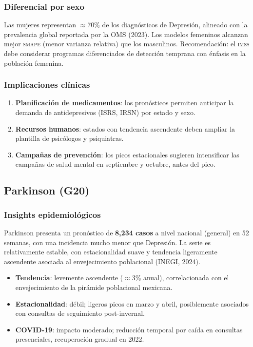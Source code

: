 \documentclass[12pt, letterpaper]{article}
\newcommand{\smape}{\textnormal{\textsc{smape}}}
\newcommand{\imss}{\textnormal{\textsc{imss}}}
\begin{document}
\subsubsection{Diferencial por sexo}

Las mujeres representan $\approx$70\% de los diagnósticos de Depresión, alineado con la prevalencia global reportada por la OMS (2023). Los modelos femeninos alcanzan mejor \smape{} (menor varianza relativa) que los masculinos. Recomendación: el {\imss} debe considerar programas diferenciados de detección temprana con énfasis en la población femenina.

\subsubsection{Implicaciones clínicas}

\begin{enumerate}[noitemsep]
    \item \textbf{Planificación de medicamentos}: los pronósticos permiten anticipar la demanda de antidepresivos (ISRS, IRSN) por estado y sexo.
    \item \textbf{Recursos humanos}: estados con tendencia ascendente deben ampliar la plantilla de psicólogos y psiquiatras.
    \item \textbf{Campañas de prevención}: los picos estacionales sugieren intensificar las campañas de salud mental en septiembre y octubre, antes del pico.
\end{enumerate}

\subsection{Parkinson (G20)}\label{subsec:parkinson}

\subsubsection{Insights epidemiológicos}

Parkinson presenta un pronóstico de \textbf{8,234 casos} a nivel nacional (general) en 52 semanas, con una incidencia mucho menor que Depresión. La serie es relativamente estable, con estacionalidad suave y tendencia ligeramente ascendente asociada al envejecimiento poblacional (INEGI, 2024).

\begin{itemize}[noitemsep]
    \item \textbf{Tendencia}: levemente ascendente ($\approx$3\% anual), correlacionada con el envejecimiento de la pirámide poblacional mexicana.
    \item \textbf{Estacionalidad}: débil; ligeros picos en marzo y abril, posiblemente asociados con consultas de seguimiento post-invernal.
    \item \textbf{COVID-19}: impacto moderado; reducción temporal por caída en consultas presenciales, recuperación gradual en 2022.
\end{itemize}
\end{document}
